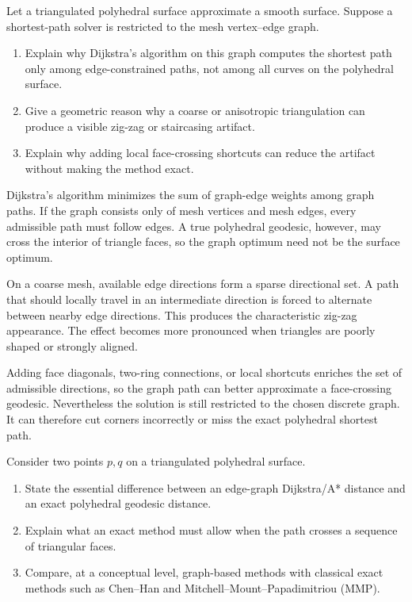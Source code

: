 \begin{problem}
\label{prob:vii-gap-38}
Let a triangulated polyhedral surface approximate a smooth surface.
Suppose a shortest-path solver is restricted to the mesh vertex--edge graph.

\begin{enumerate}
\item Explain why Dijkstra's algorithm on this graph computes the shortest
path only among edge-constrained paths, not among all curves on the
polyhedral surface.
\item Give a geometric reason why a coarse or anisotropic triangulation can
produce a visible zig-zag or staircasing artifact.
\item Explain why adding local face-crossing shortcuts can reduce the artifact
without making the method exact.
\end{enumerate}
\end{problem}

\begin{solution}
Dijkstra's algorithm minimizes the sum of graph-edge weights among graph
paths.  If the graph consists only of mesh vertices and mesh edges, every
admissible path must follow edges.  A true polyhedral geodesic, however, may
cross the interior of triangle faces, so the graph optimum need not be the
surface optimum.

On a coarse mesh, available edge directions form a sparse directional set.
A path that should locally travel in an intermediate direction is forced to
alternate between nearby edge directions.  This produces the characteristic
zig-zag appearance.  The effect becomes more pronounced when triangles are
poorly shaped or strongly aligned.

Adding face diagonals, two-ring connections, or local shortcuts enriches the
set of admissible directions, so the graph path can better approximate a
face-crossing geodesic.  Nevertheless the solution is still restricted to
the chosen discrete graph.  It can therefore cut corners incorrectly or miss
the exact polyhedral shortest path.
\end{solution}


\begin{problem}
\label{prob:vii-gap-39}
Consider two points \(p,q\) on a triangulated polyhedral surface.

\begin{enumerate}
\item State the essential difference between an edge-graph Dijkstra/A*
distance and an exact polyhedral geodesic distance.
\item Explain what an exact method must allow when the path crosses a sequence
of triangular faces.
\item Compare, at a conceptual level, graph-based methods with classical exact
methods such as Chen--Han and Mitchell--Mount--Papadimitriou (MMP).
\end{enumerate}
\end{problem}

